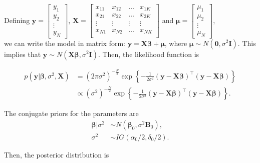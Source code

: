 Defining $\bm{y}=\begin{bmatrix} y_1\\ y_2\\ \vdots \\ y_N \end{bmatrix}$, $\bm{X}=\begin{bmatrix} x_{11} & x_{12} & \ldots & x_{1K}\\ x_{21} & x_{22} & \ldots & x_{2K}\\ \vdots & \vdots & \vdots & \vdots\\ x_{N1} & x_{N2} & \ldots & x_{NK}\\ \end{bmatrix}$ and $\bm{\mu}=\begin{bmatrix} \mu_1\\ \mu_2\\ \vdots \\ \mu_N \end{bmatrix}$,\\

we can write the model in matrix form: ${\bm{y}}={\bm{X}}\bm{\beta}+\bm{\mu}$, where $\bm{\mu}\sim N(\bm{0},\sigma^2{\bm{I}})$. This implies that ${\bm{y}}\sim N({\bm{X}}\bm{\beta},\sigma^2\bm{I})$. Then, the likelihood function is

\begin{align*}
	p({\bm{y}}|\bm{\beta}, \sigma^2, {{\bm{X}}}) & = (2\pi\sigma^2)^{-\frac{N}{2}} \exp \left\{-\frac{1}{2\sigma^2} ({\bm{y}} - {\bm{X}}\bm{\beta})^{\top}({\bm{y}} - {\bm{X}}\bm{\beta}) \right\}  \\
	& \propto (\sigma^2)^{-\frac{N}{2}} \exp \left\{-\frac{1}{2\sigma^2} ({\bm{y}} - {\bm{X}}\bm{\beta})^{\top}({\bm{y}} - {\bm{X}}\bm{\beta}) \right\}.
\end{align*}

The conjugate priors for the parameters are
\begin{align*}
	\bm{\beta}|\sigma^2 & \sim N(\bm{\beta}_0, \sigma^2 {\bm{B}}_0),\\
	\sigma^2 & \sim IG(\alpha_0/2, \delta_0/2).
\end{align*}

Then, the posterior distribution is

